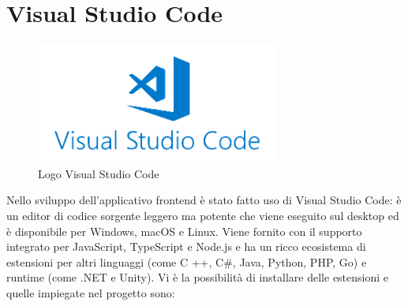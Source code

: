 \section{Visual Studio Code}
\begin{figure}[h!]
\begin{center}
  \includegraphics[width=8cm]{images/VSCode.png}
  \caption{Logo Visual Studio Code}\label{fig:VisualStudioCode}
\end{center}
\end{figure}
Nello sviluppo dell'applicativo frontend è stato fatto uso di Visual Studio Code: è un editor di codice sorgente leggero ma potente che viene eseguito sul desktop ed è disponibile per Windows, macOS e Linux. Viene fornito con il supporto integrato per JavaScript, TypeScript e Node.js e ha un ricco ecosistema di estensioni per altri linguaggi (come C ++, C\#, Java, Python, PHP, Go) e runtime (come .NET e Unity). Vi è la possibilità di installare delle estensioni e quelle impiegate nel progetto sono:
